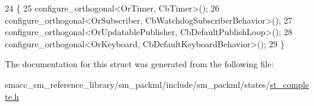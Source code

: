 \begin{DoxyCode}
24     \{
25         configure\_orthogonal<OrTimer, CbTimer>();   
26         configure\_orthogonal<OrSubscriber, CbWatchdogSubscriberBehavior>();
27         configure\_orthogonal<OrUpdatablePublisher, CbDefaultPublishLoop>();
28         configure\_orthogonal<OrKeyboard, CbDefaultKeyboardBehavior>();
29     \}
\end{DoxyCode}


The documentation for this struct was generated from the following file\+:\begin{DoxyCompactItemize}
\item 
smacc\+\_\+sm\+\_\+reference\+\_\+library/sm\+\_\+packml/include/sm\+\_\+packml/states/\hyperlink{st__complete_8h}{st\+\_\+complete.\+h}\end{DoxyCompactItemize}
